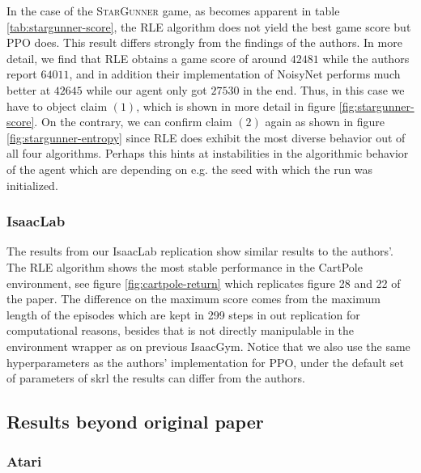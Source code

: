 \documentclass[10pt]{article} %
\begin{document}
\noindent In the case of the \textsc{StarGunner} game, as becomes apparent in table \ref{tab:stargunner-score}, the RLE algorithm does not yield the best game score but PPO does. This result differs strongly from the findings of the authors. In more detail, we find that RLE obtains a game score of around $42481$ while the authors report $64011$, and in addition their implementation of NoisyNet performs much better at $42645$ while our agent only got $27530$ in the end. Thus, in this case we have to object claim $(1)$, which is shown in more detail in figure \ref{fig:stargunner-score}. On the contrary, we can confirm claim $(2)$ again as shown in figure \ref{fig:stargunner-entropy} since RLE does exhibit the most diverse behavior out of all four algorithms. Perhaps this hints at instabilities in the algorithmic behavior of the agent which are depending on e.g. the seed with which the run was initialized.

\subsubsection{IsaacLab}
The results from our IsaacLab replication show similar results to the authors'. The RLE algorithm shows the most stable performance in the CartPole environment, see figure \ref{fig:cartpole-return} which replicates
figure 28 and 22 of the paper. The difference on the maximum score comes from the maximum length of the episodes which are kept in 299 steps in out replication for computational reasons, besides that is not directly manipulable 
in the environment wrapper as on previous IsaacGym. Notice that we also use the same hyperparameters as the authors' implementation for PPO, under the default set of parameters of skrl the results can differ from the authors.

\subsection{Results beyond original paper}

\subsubsection{Atari}
\end{document}
